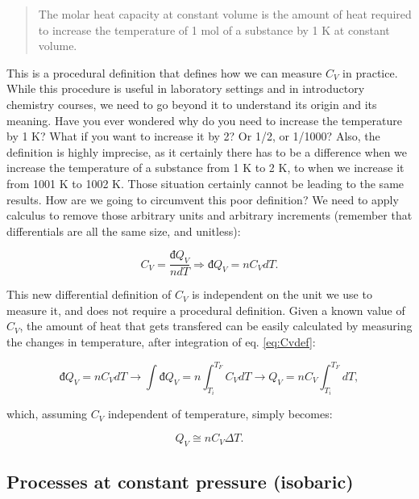 \documentclass[
  9pt,
]{extbook}
\theoremstyle{definition}
\theoremstyle{definition}
\theoremstyle{definition}
\theoremstyle{definition}
\theoremstyle{remark}
\begin{document}
\begin{quote}
The molar heat capacity at constant volume is the amount of heat required to increase the temperature of 1 mol of a substance by 1 K at constant volume.
\end{quote}

This is a procedural definition that defines how we can measure \(C_V\) in practice. While this procedure is useful in laboratory settings and in introductory chemistry courses, we need to go beyond it to understand its origin and its meaning. Have you ever wondered why do you need to increase the temperature by 1 K? What if you want to increase it by 2? Or 1/2, or 1/1000? Also, the definition is highly imprecise, as it certainly there has to be a difference when we increase the temperature of a substance from 1 K to 2 K, to when we increase it from 1001 K to 1002 K. Those situation certainly cannot be leading to the same results. How are we going to circumvent this poor definition? We need to apply calculus to remove those arbitrary units and arbitrary increments (remember that differentials are all the same size, and unitless):

\begin{equation}
  C_V = \frac{đ Q_V}{n dT} \Rightarrow đ Q_V = n C_V dT.
  \label{eq:Cvdef}
\end{equation}

This new differential definition of \(C_V\) is independent on the unit we use to measure it, and does not require a procedural definition. Given a known value of \(C_V\), the amount of heat that gets transfered can be easily calculated by measuring the changes in temperature, after integration of eq. \eqref{eq:Cvdef}:

\begin{equation}
  đ Q_V = n C_V dT \rightarrow \int đ Q_V = n \int_{T_i}^{T_F}C_V dT \rightarrow Q_V = n C_V \int_{T_i}^{T_F}dT,
  \label{eq:Cvint1}
\end{equation}

which, assuming \(C_V\) independent of temperature, simply becomes:

\begin{equation}
  Q_V \cong n C_V \Delta T.
  \label{eq:Cvint}
\end{equation}

\subsection{Processes at constant pressure (isobaric)}\label{heatconstp}
\end{document}
